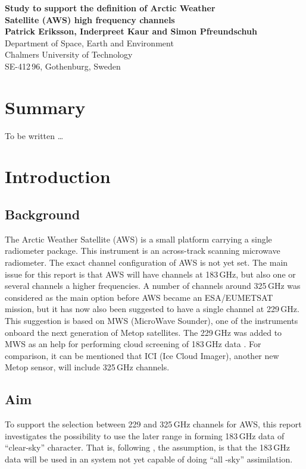 \documentclass[12pt]{article}
\begin{document}
\thispagestyle{empty}
\noindent
\textbf{\Large Study to support the definition of Arctic Weather \vspace{1mm}\\
Satellite (AWS) high frequency channels} \vspace{8mm}\\
{\bf Patrick Eriksson, Inderpreet Kaur and Simon Pfreundschuh}\\
Department of Space, Earth and Environment\\
Chalmers University of Technology\\
SE-412\,96, Gothenburg, Sweden\vspace{10mm}

\section*{Summary}
%
To be written \dots



\setcounter{tocdepth}{1} 
\tableofcontents


\newpage
\setcounter{page}{1}

\section{Introduction}
%
\subsection{Background}
The Arctic Weather Satellite (AWS) is a small platform carrying a single
radiometer package. This instrument is an across-track scanning microwave
radiometer. The exact channel configuration of AWS is not yet set. The main
issue for this report is that AWS will have channels at 183\,GHz, but also one
or several channels a higher frequencies. A number of channels around 325\,GHz
was considered as the main option before AWS became an ESA/EUMETSAT mission,
but it has now also been suggested to have a single channel at 229\,GHz. This
suggestion is based on MWS (MicroWave Sounder), one of the instruments onboard
the next generation of Metop satellites. The 229\,GHz was added to MWS as an
help for performing cloud screening of 183\,GHz data
\citep{rekha2012potential}. For comparison, it can be mentioned that ICI (Ice
Cloud Imager), another new Metop sensor, will include 325\,GHz channels.

\subsection{Aim}
%
To support the selection between 229 and 325\,GHz channels for AWS, this report
investigates the possibility to use the later range in forming 183\,GHz data of
``clear-sky'' character. That is, following \citet{rekha2012potential}, the
assumption, is that the 183\,GHz data will be used in an system not yet
capable of doing ``all -sky'' assimilation.
\end{document}
